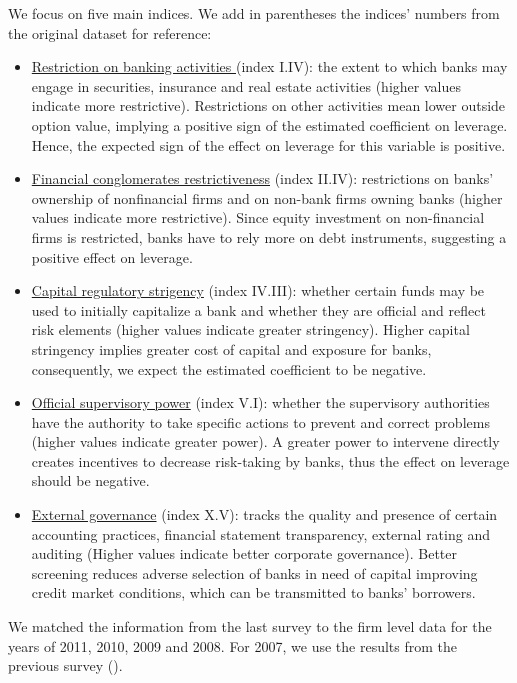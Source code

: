 \documentclass[12pt]{article}
\begin{document}
     We focus on five main indices. We add in parentheses the indices' numbers from the original dataset for reference:
      \begin{itemize}
     	\item \underline{Restriction on banking activities } (index I.IV): the extent to which banks may engage in securities, insurance and real estate activities (higher values indicate more restrictive). Restrictions on other activities mean lower outside option value, implying a positive sign of the estimated coefficient on leverage. Hence, the expected sign of the effect on leverage for this variable is positive.  
     	\item \underline{Financial conglomerates restrictiveness} (index II.IV): restrictions on banks' ownership of nonfinancial firms and on non-bank firms owning banks (higher values indicate more restrictive). Since equity investment on non-financial firms is restricted, banks have to rely more on debt instruments, suggesting a positive effect on leverage. 
     	\item  \underline{Capital regulatory strigency} (index IV.III): whether certain funds may be used to initially capitalize a bank and whether they are official and reflect risk elements (higher values indicate greater stringency). Higher capital stringency implies greater cost of capital and exposure for banks, consequently, we expect the estimated coefficient to be negative.
     	\item \underline{Official supervisory power} (index V.I): whether the supervisory authorities have the authority to take specific actions to prevent and correct problems (higher values indicate greater power). A greater power to intervene directly creates incentives to decrease risk-taking by banks, thus the effect on leverage should be negative.
     	\item \underline{External governance} (index X.V): tracks the quality and presence of certain accounting practices, financial statement transparency, external rating and auditing  (Higher values indicate better corporate governance). Better screening reduces adverse selection of banks in need of capital improving credit market conditions, which can be transmitted to banks' borrowers.
     \end{itemize} 
	  
	  We matched the information from the last survey to the firm level data for the years of 2011, 2010, 2009 and 2008. For 2007, we use the results from the previous survey (\cite{barth2008bank}).  
	   
\end{document}
